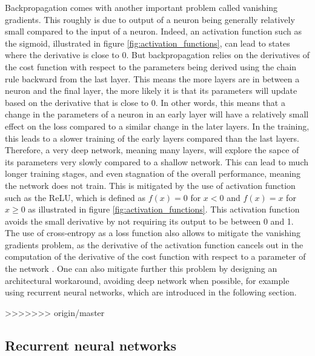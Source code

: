 Backpropagation comes with another important problem called vanishing gradients. This roughly is due to output of a neuron being generally relatively small compared to the input of a neuron. Indeed, an activation function such as the sigmoid, illustrated in figure \ref{fig:activation_functions}, can lead to states where the derivative is close to 0. But backpropagation relies on the derivatives of the cost function with respect to the parameters being derived using the chain rule backward from the last layer. This means the more layers are in between a neuron and the final layer, the more likely it is that its parameters will update based on the derivative that is close to 0. In other words, this means that a change in the parameters of a neuron in an early layer will have a relatively small effect on the loss compared to a similar change in the later layers. In the training, this leads to a slower training of the early layers compared than the last layers. Therefore, a very deep network, meaning many layers, will explore the sapce of its parameters very slowly compared to a shallow network. This can lead to much longer training stages, and even stagnation of the overall performance, meaning the network does not train. This is mitigated by the use of activation function such as the ReLU, which is defined as $f(x)=0$ for $x < 0$ and $f(x)=x$ for $x \geq 0$ as illustrated in figure \ref{fig:activation_functions}. This activation function avoids the small derivative by not requiring its output to be between 0 and 1. The use of cross-entropy as a loss function also allows to mitigate the vanishing gradients problem, as the derivative of the activation function cancels out in the computation of the derivative of the cost function with respect to a parameter of the network \cite{NN_book}. One can also mitigate further this problem by designing an architectural workaround, avoiding deep network when possible, for example using recurrent neural networks, which are introduced in the following section.

>>>>>>> origin/master


\subsection{Recurrent neural networks}

